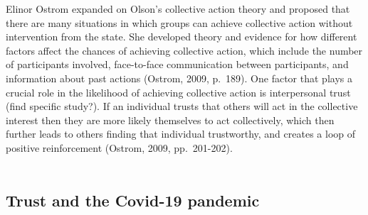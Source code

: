 \documentclass[
  11pt,
]{article}
\begin{document}
Elinor Ostrom expanded on Olson's collective action theory and proposed that there are many situations in which groups can achieve collective action without intervention from the state. She developed theory and evidence for how different factors affect the chances of achieving collective action, which include the number of participants involved, face-to-face communication between participants, and information about past actions (Ostrom, 2009, p.~189). One factor that plays a crucial role in the likelihood of achieving collective action is interpersonal trust (find specific study?). If an individual trusts that others will act in the collective interest then they are more likely themselves to act collectively, which then further leads to others finding that individual trustworthy, and creates a loop of positive reinforcement (Ostrom, 2009, pp.~201-202).\\
~\\

\hypertarget{trust-and-the-covid-19-pandemic}{%
\subsection{Trust and the Covid-19 pandemic}\label{trust-and-the-covid-19-pandemic}}
\end{document}
